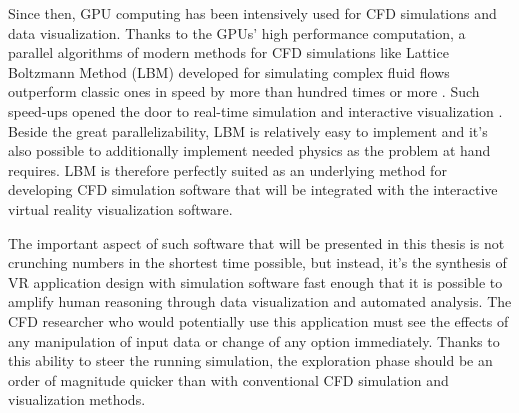 Since then, GPU computing has been intensively used for CFD simulations and data visualization. Thanks to the GPUs' high performance computation, a parallel algorithms of modern methods for CFD simulations like Lattice Boltzmann Method (LBM) developed for simulating complex fluid flows outperform classic ones in speed by more than hundred times or more \citep{qianLatticeBGKModels1992,wittmannLatticeBoltzmannBenchmark2018,boroniFULLGPUImplementation2017,harwoodLUMAManycoreFluid2018,szokePerformanceEvaluationTwoDimensional2017,tranPerformanceOptimization3D2017,januszewskiSailfishFlexibleMultiGPU2014}. Such speed-ups opened the door to real-time simulation and interactive visualization \citep{kressSituVisualizationTechniques,kolihaOnlineVisualizationInteractive2015,wangInteractive3DFluid2019,Mawson2014InteractiveFI,thureyInteractiveFreeSurface,linxweilerHighlyInteractiveComputational2010,delboscRealTimeSimulationIndoor}. Beside the great parallelizability, LBM is relatively easy to implement and it's also possible to additionally implement needed physics as the problem at hand requires.
LBM is therefore perfectly suited as an underlying method for developing CFD simulation software that will be integrated with the interactive virtual reality visualization software.

The important aspect of such software that will be presented in this thesis is not crunching numbers in the shortest time possible, but instead, it's the synthesis of VR application design with simulation software fast enough that it is possible to amplify human reasoning through data visualization and automated analysis. The CFD researcher who would potentially use this application must see the effects of any manipulation of input data or change of any option immediately. Thanks to this ability to steer the running simulation, the exploration phase should be an order of magnitude quicker than with conventional CFD simulation and visualization methods.

